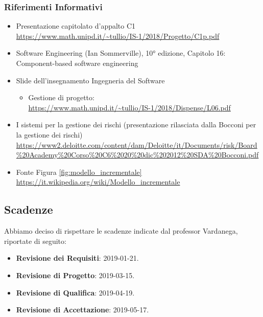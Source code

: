 		\subsubsection{Riferimenti Informativi}\label{rifinfo}
			\begin{itemize}
				\item Presentazione capitolato d'appalto C1\\
				\url{https://www.math.unipd.it/~tullio/IS-1/2018/Progetto/C1p.pdf}
				\item Software Engineering (Ian Sommerville), 10° edizione, Capitolo 16: Component-based software engineering
				\item Slide dell’insegnamento Ingegneria del Software
				\begin{itemize}
					\item Gestione di progetto:\\
					\url{https://www.math.unipd.it/~tullio/IS-1/2018/Dispense/L06.pdf} 
				\end{itemize}
				\item I sistemi per la gestione dei rischi (presentazione rilasciata dalla Bocconi per la gestione dei rischi)\\
				\url{https://www2.deloitte.com/content/dam/Deloitte/it/Documents/risk/Board\%20Academy\%20Corso\%20C6\%2020\%20dic\%202012\%20SDA\%20Bocconi.pdf}
				\item Fonte Figura \ref{fig:modello_incrementale}\\
				\url{https://it.wikipedia.org/wiki/Modello_incrementale}
			\end{itemize}
		
	\subsection{Scadenze}\label{Scadenze}
	Abbiamo deciso di rispettare le scadenze indicate dal professor Vardanega, riportate di seguito:
	\begin{itemize}
		\item \textbf{Revisione dei Requisiti}: 2019-01-21.
		\item \textbf{Revisione di Progetto}: 2019-03-15.
		\item \textbf{Revisione di Qualifica}: 2019-04-19.
		\item \textbf{Revisione di Accettazione}: 2019-05-17.
	\end{itemize}
	
